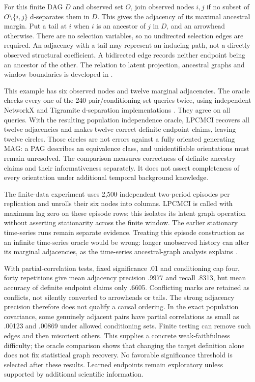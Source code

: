 For this finite DAG $D$ and observed set $O$, join observed nodes $i,j$ if
no subset of $O\setminus\{i,j\}$ d-separates them in $D$. This gives the
adjacency of its maximal ancestral margin. Put a tail at $i$ when $i$ is an
ancestor of $j$ in $D$, and an arrowhead otherwise. There are no selection
variables, so no undirected selection edges are required. An adjacency with
a tail may represent an inducing path, not a directly observed structural
coefficient. A bidirected edge records neither endpoint being an ancestor
of the other. The relation to latent projection, ancestral graphs and
window boundaries is developed in \citet{zhang2008,gerhardus2021}.

This example has six observed nodes and twelve marginal adjacencies. The
oracle checks every one of the 240 pair/conditioning-set queries twice,
using independent NetworkX and Tigramite d-separation implementations
\citep{runtime_networkx_dynamic}.
They agree on all queries. With the resulting population independence
oracle, LPCMCI recovers all twelve adjacencies and makes twelve correct
definite endpoint claims, leaving twelve circles. Those circles are not
errors against a fully oriented generating MAG: a PAG describes an
equivalence class, and unidentifiable orientations must remain unresolved.
The comparison measures correctness of definite ancestry claims and their
informativeness separately. It does not assert completeness of every
orientation under additional temporal background knowledge.

The finite-data experiment uses 2,500 independent two-period episodes per
replication and unrolls their six nodes into columns. LPCMCI is called with
maximum lag zero on these episode rows; this isolates its latent graph
operation without asserting stationarity across the finite window. The
earlier stationary time-series runs remain separate evidence. Treating this
episode construction as an infinite time-series oracle would be wrong:
longer unobserved history can alter its marginal adjacencies, as the
time-series ancestral-graph analysis explains \citep{gerhardus2021}.

With partial-correlation tests, fixed significance .01 and conditioning cap
four, forty repetitions give mean adjacency precision .9977 and recall
.8313, but mean accuracy of definite endpoint claims only .6605. Conflicting
marks are retained as conflicts, not silently converted to arrowheads or
tails. The strong adjacency precision therefore does not qualify a causal
ordering. In the exact population covariance, some genuinely adjacent pairs
have partial correlations as small as .00123 and .00869 under allowed
conditioning sets. Finite testing can remove such edges and then misorient
others. This supplies a concrete weak-faithfulness difficulty; the oracle
comparison shows that changing the target definition alone does not fix
statistical graph recovery. No favorable significance threshold is selected
after these results. Learned endpoints remain exploratory unless supported
by additional scientific information.

